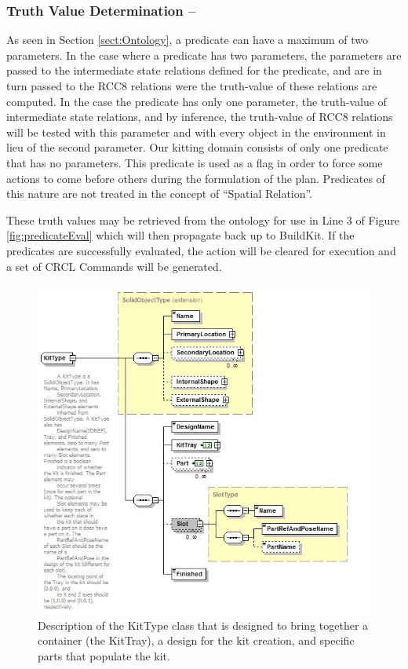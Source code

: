 \subsubsection{Truth Value Determination --}
As seen in Section \ref{sect:Ontology}, a predicate can have a maximum of two parameters. In the case where a predicate has two parameters, the parameters are passed to the intermediate state relations defined for the predicate, and are in turn passed to the RCC8 relations were the truth-value of these relations are computed. In the case the predicate has only one parameter, the truth-value of intermediate state relations, and by inference, the truth-value of RCC8 relations will be tested with this parameter and with every object in the environment in lieu of the second parameter. Our kitting domain consists of only one predicate that has no parameters. This predicate is used as a flag in order to force some actions to come before others during the formulation of the plan. Predicates of this nature are not treated in the concept of ``Spatial Relation''.

These truth values may be retrieved from the ontology for use in Line 3 of Figure
\ref{fig:predicateEval} which will then propagate back up to {\sc BuildKit}. If
the predicates are successfully evaluated, the action will be cleared for 
execution and a set of CRCL Commands will be 
generated.
%
\begin{figure}[htb!]
\begin{center}
\includegraphics[width=12cm]{images/Kit.jpg}
\caption{Description of the KitType class that is designed to bring together
a container (the KitTray), a design for the kit creation, and specific parts
that populate the kit.}
\label{fig:kit}
\end{center}
\end{figure}
%
